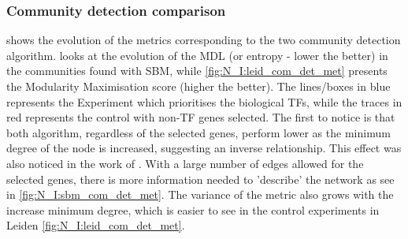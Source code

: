\subsubsection{Community detection comparison}

 shows the evolution of the metrics corresponding to the two community detection algorithm.  looks at the evolution of the MDL (or entropy - lower the better) in the communities found with SBM, while \cref{fig:N_I:leid_com_det_met} presents the Modularity Maximisation score (higher the better). The lines/boxes in blue represents the Experiment which prioritises the biological TFs, while the traces in red represents the control with non-TF genes selected. The first to notice is that both algorithm, regardless of the selected genes, perform lower as the minimum degree of the node is increased, suggesting an inverse relationship. This effect was also noticed in the work of \citet{Care2019-ij}. With a large number of edges allowed for the selected genes, there is more information needed to 'describe' the network as see in \cref{fig:N_I:sbm_com_det_met}. The variance of the metric also grows with the increase minimum degree, which is easier to see in the control experiments in Leiden \cref{fig:N_I:leid_com_det_met}.


